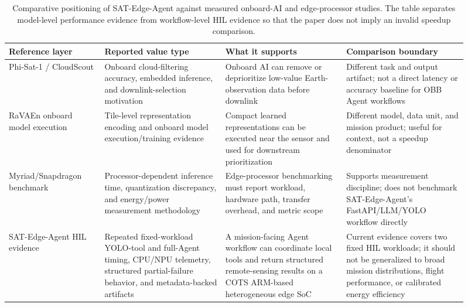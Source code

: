 \documentclass[10pt,letterpaper]{article}
\begin{document}
\begin{table}[htbp]
\centering
\small
\renewcommand{\arraystretch}{1.12}
\begin{tabular}{p{0.19\linewidth}p{0.24\linewidth}p{0.24\linewidth}p{0.24\linewidth}}
\toprule
\textbf{Reference layer} & \textbf{Reported value type} & \textbf{What it supports} & \textbf{Comparison boundary} \\
\midrule
Phi-Sat-1 / CloudScout & Onboard cloud-filtering accuracy, embedded inference, and downlink-selection motivation & Onboard AI can remove or deprioritize low-value Earth-observation data before downlink & Different task and output artifact; not a direct latency or accuracy baseline for OBB Agent workflows \\
RaVAEn onboard model execution & Tile-level representation encoding and onboard model execution/training evidence & Compact learned representations can be executed near the sensor and used for downstream prioritization & Different model, data unit, and mission product; useful for context, not a speedup denominator \\
Myriad/Snapdragon benchmark & Processor-dependent inference time, quantization discrepancy, and energy/power measurement methodology & Edge-processor benchmarking must report workload, hardware path, transfer overhead, and metric scope & Supports measurement discipline; does not benchmark SAT-Edge-Agent's FastAPI/LLM/YOLO workflow directly \\
SAT-Edge-Agent HIL evidence & Repeated fixed-workload YOLO-tool and full-Agent timing, CPU/NPU telemetry, structured partial-failure behavior, and metadata-backed artifacts & A mission-facing Agent workflow can coordinate local tools and return structured remote-sensing results on a COTS ARM-based heterogeneous edge SoC & Current evidence covers two fixed HIL workloads; it should not be generalized to broad mission distributions, flight performance, or calibrated energy efficiency \\
\bottomrule
\end{tabular}
\caption{Comparative positioning of SAT-Edge-Agent against measured onboard-AI and edge-processor studies. The table separates model-level performance evidence from workflow-level HIL evidence so that the paper does not imply an invalid speedup comparison.}
\label{tab:comparative_positioning}
\end{table}
\end{document}

